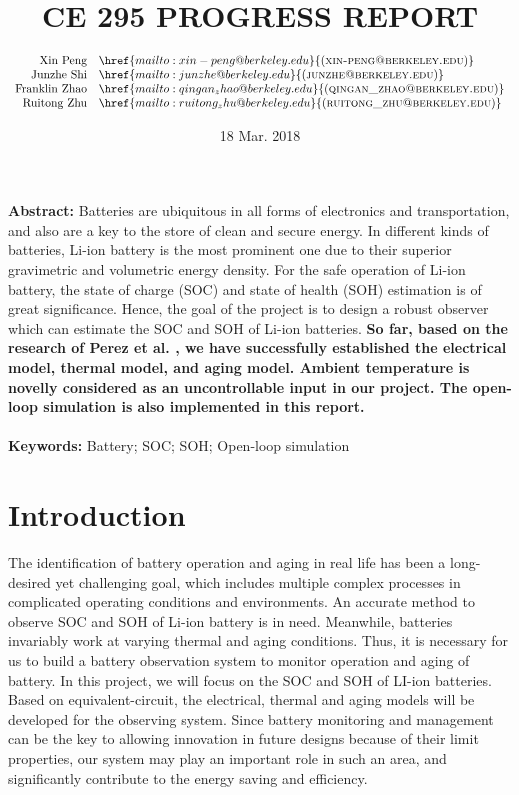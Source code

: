 \documentclass[10pt]{article}
\title{\huge CE 295 PROGRESS REPORT}
\author{
$\begin{array}{rl}
\text{Xin Peng}&\href{mailto:xin-peng@berkeley.edu}{(\textsc{xin-peng@berkeley.edu})}\\
\text{Junzhe Shi}&\href{mailto:junzhe@berkeley.edu}{(\textsc{junzhe@berkeley.edu})}\ \ \ \\
\text{Franklin Zhao}&\href{mailto:qingan_zhao@berkeley.edu}{(\textsc{qingan\_zhao@berkeley.edu})}\\
\text{Ruitong Zhu}&\href{mailto:ruitong_zhu@berkeley.edu}{(\textsc{ruitong\_zhu@berkeley.edu})}
\end{array}$
}
\date{18 Mar. 2018}
\begin{document}
\maketitle

\renewcommand{\theequation}{\arabic{equation}}
\renewcommand{\figurename}{Fig.}
\renewcommand\thesubsection{(\alph{subsection})}
\renewcommand\thesubsubsection{\Roman{subsubsection}}

\noindent \textbf{Abstract:} Batteries are ubiquitous in all forms of electronics and transportation, and also are a key to the store of clean and secure energy. In different kinds of batteries,  Li-ion battery is the most prominent one due to their superior gravimetric and volumetric energy density.  For the safe operation of Li-ion battery, the state of charge (SOC) and state of health (SOH) estimation is of great significance. Hence, the goal of the project is to design a robust observer which can estimate the SOC and SOH of Li-ion batteries. \textbf{So far, based on the research of Perez et al. \cite{ref:1}, we have successfully established the electrical model, thermal model, and aging model. Ambient temperature is novelly considered as an uncontrollable input in our project. The open-loop simulation is also implemented in this report.}\\\\
\textbf{Keywords:} Battery; SOC; SOH; Open-loop simulation  
\section{Introduction}
The identification of battery operation and aging in real life has been a long-desired yet challenging goal, which includes multiple complex processes in complicated operating conditions and environments. An accurate method to observe SOC and SOH of Li-ion battery is in need. Meanwhile, batteries invariably work at varying thermal and aging conditions. Thus, it is necessary for us to build a battery observation system to monitor operation and aging of battery. In this project, we will focus on the SOC and SOH of LI-ion batteries. Based on equivalent-circuit, the electrical, thermal and aging models will be developed for the observing system. Since battery monitoring and management can be the key to allowing innovation in future designs because of their limit properties, our system may play an important role in such an area, and significantly contribute to the energy saving and efficiency. 
\end{document}
